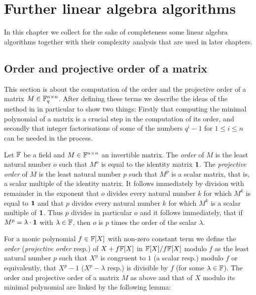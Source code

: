 
\chapter{Further linear algebra algorithms}

In this chapter we collect for the sake of completeness some
linear algebra algorithms together with their complexity analysis
that are used in later chapters. 

\section{Order and projective order of a matrix}
\label{sec:orders}

This section is about the computation of the order and the projective
order of a matrix $M \in \mathbb{F}_q^{n \times n}$. After defining these 
terms we describe the 
ideas of the method in \cite{CellLeedOrder} in particular to show
two things: Firstly that computing the minimal polynomial of a matrix
is a crucial step in the computation of its order, and secondly that
integer factorisations of some of the numbers $q^i-1$ for $1 \le i \le n$ 
can be needed in the process.

\begin{DefProp}
Let $\mathbb{F}$ be a field and $M \in \mathbb{F}^{n \times
n}$ an invertible matrix. The \emph{order} of $M$ is the least natural
number $o$ such that $M^o$ is equal to the identity matrix\/ $\mathbf{1}$.
The \emph{projective order} of $M$ is the least natural number $p$
such that $M^p$ is a scalar matrix, that is, a scalar multiple of the
identity matrix. It follows immediately by division with remainder in
the exponent that $o$ divides every natural number $k$ for which 
$M^k$ is equal to\/ $\mathbf{1}$ and that $p$ divides every natural number $k$
for which $M^k$ is a scalar multiple of\/ $\mathbf{1}$. Thus $p$ divides in
particular $o$ and it follows immediately, that if $M^p = \lambda \cdot
\mathbf{1}$ with $\lambda \in \mathbb{F}$, then $o$ is $p$ times the order of the
scalar $\lambda$. \proofend
\end{DefProp}

For a monic polynomial $f \in \mathbb{F}[X]$ with non-zero constant term
we define the \emph{order} (\emph{projective order} resp.) of 
$X + f\mathbb{F}[X]$ in $\mathbb{F}[X]/f\mathbb{F}[X]$ modulo $f$ as the least natural 
number $p$ such that $X^p$ is congruent 
to $1$ (a scalar resp.) modulo $f$ or equivalently, that $X^p-1$ 
($X^p-\lambda$ resp.) is
divisible by $f$ (for some $\lambda \in \mathbb{F}$). 
The order and projective order
of a matrix $M$ as above and that of $X$ modulo its minimal polynomial are 
linked by the following lemma:

